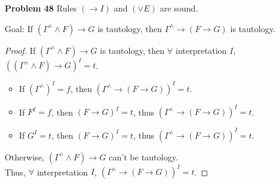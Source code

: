 \begin{enumerate}
\item[\textbf{Problem 48}] Rules $(\rightarrow I)$ and $(\vee E)$ are sound.  \\
\begin{center}
\end{center}
Goal: If $(\Gamma^{\wedge} \wedge F) \rightarrow G$ is tautology, then $\Gamma^{\wedge} \rightarrow (F \rightarrow G)$ is tautology. 
\begin{proof}
If $(\Gamma^{\wedge} \wedge F) \rightarrow G$ is tautology, then $\forall$ interpretation $I$,  $((\Gamma^{\wedge} \wedge F) \rightarrow G)^I = t$. 
\begin{itemize}
\item If $(\Gamma^{\wedge})^I = f$, then $(\Gamma^{\wedge} \rightarrow (F \rightarrow G))^I = t$. 
\item If $F^I = f$, then $(F \rightarrow G)^I = t$, thus $(\Gamma^{\wedge} \rightarrow (F \rightarrow G))^I = t$. 
\item If $G^I = t$, then $(F \rightarrow G)^I = t$, thus $(\Gamma^{\wedge} \rightarrow (F \rightarrow G))^I = t$. 
\end{itemize}
Otherwise, $(\Gamma^{\wedge} \wedge F) \rightarrow G$ can't be tautology. \\
Thus, $\forall$ interpretation $I$,  $(\Gamma^{\wedge} \rightarrow (F \rightarrow G))^I = t$. 
\end{proof}


\end{enumerate}
